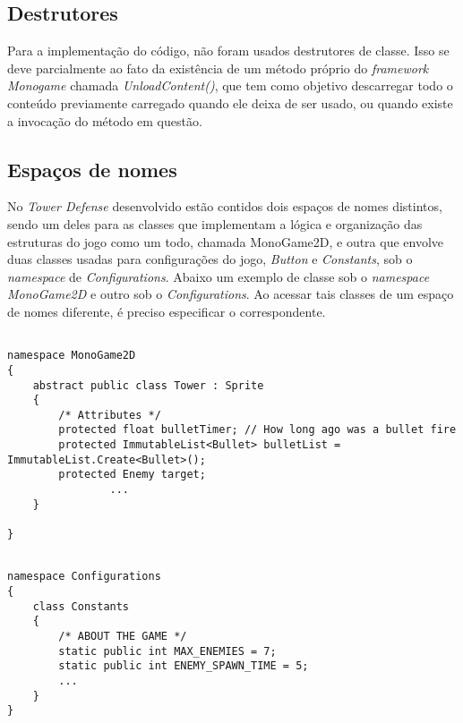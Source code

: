 \documentclass[rel_mlp]{iiufrgs}
\begin{document}
\subsection{Destrutores}

Para a implementação do código, não foram usados destrutores de classe. Isso se deve parcialmente ao fato da existência de um método próprio do \textit{framework Monogame} chamada \textit{UnloadContent()}, que tem como objetivo descarregar todo o conteúdo previamente carregado quando ele deixa de ser usado, ou quando existe a invocação do método em questão. 

\subsection{Espaços de nomes}

No \textit{Tower Defense} desenvolvido estão contidos dois espaços de nomes distintos, sendo um deles para as classes que implementam a lógica e organização das estruturas do jogo como um todo, chamada MonoGame2D, e outra que envolve duas classes usadas para configurações do jogo, \textit{Button} e \textit{Constants}, sob o \textit{namespace} de \textit{Configurations}. Abaixo um exemplo de classe sob o \textit{namespace MonoGame2D} e outro sob o \textit{Configurations}. Ao acessar tais classes de um espaço de nomes diferente, é preciso especificar o correspondente.

\begin{lstlisting}[caption=Trecho de código C\# retirado da implementação deste trabalho, label=lst:test]

namespace MonoGame2D
{
    abstract public class Tower : Sprite
	{
        /* Attributes */
        protected float bulletTimer; // How long ago was a bullet fire
        protected ImmutableList<Bullet> bulletList = ImmutableList.Create<Bullet>();
        protected Enemy target;
				...
	}
	
}

\end{lstlisting}

\begin{lstlisting}[caption=Trecho de código C\# retirado da implementação deste trabalho, label=lst:test]

namespace Configurations
{
	class Constants
	{
		/* ABOUT THE GAME */
		static public int MAX_ENEMIES = 7;
		static public int ENEMY_SPAWN_TIME = 5;
		...
	}
}

\end{lstlisting}
\end{document}
